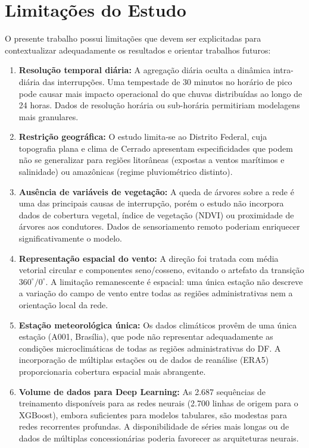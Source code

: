 \section{Limitações do Estudo}\label{sec:limitacoes}

O presente trabalho possui limitações que devem ser explicitadas para contextualizar adequadamente os resultados e orientar trabalhos futuros:

\begin{enumerate}
    \item \textbf{Resolução temporal diária:} A agregação diária oculta a dinâmica intra-diária das interrupções. Uma tempestade de 30 minutos no horário de pico pode causar mais impacto operacional do que chuvas distribuídas ao longo de 24 horas. Dados de resolução horária ou sub-horária permitiriam modelagens mais granulares.

    \item \textbf{Restrição geográfica:} O estudo limita-se ao Distrito Federal, cuja topografia plana e clima de Cerrado apresentam especificidades que podem não se generalizar para regiões litorâneas (expostas a ventos marítimos e salinidade) ou amazônicas (regime pluviométrico distinto).

    \item \textbf{Ausência de variáveis de vegetação:} A queda de árvores sobre a rede é uma das principais causas de interrupção, porém o estudo não incorpora dados de cobertura vegetal, índice de vegetação (NDVI) ou proximidade de árvores aos condutores. Dados de sensoriamento remoto poderiam enriquecer significativamente o modelo.

    \item \textbf{Representação espacial do vento:} A direção foi tratada com média vetorial circular e componentes seno/cosseno, evitando o artefato da transição $360^\circ/0^\circ$. A limitação remanescente é espacial: uma única estação não descreve a variação do campo de vento entre todas as regiões administrativas nem a orientação local da rede.

    \item \textbf{Estação meteorológica única:} Os dados climáticos provêm de uma única estação (A001, Brasília), que pode não representar adequadamente as condições microclimáticas de todas as regiões administrativas do DF. A incorporação de múltiplas estações ou de dados de reanálise (ERA5) proporcionaria cobertura espacial mais abrangente.

    \item \textbf{Volume de dados para Deep Learning:} As 2.687 sequências de treinamento disponíveis para as redes neurais (2.700 linhas de origem para o XGBoost), embora suficientes para modelos tabulares, são modestas para redes recorrentes profundas. A disponibilidade de séries mais longas ou de dados de múltiplas concessionárias poderia favorecer as arquiteturas neurais.


\end{enumerate}
